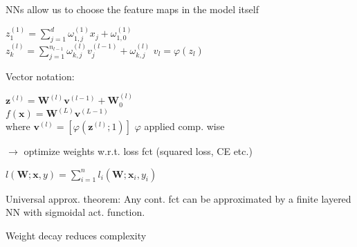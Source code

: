 NNs allow us to choose the feature maps in the model itself


\begin{center}
    $z_1^{(1)} = \sum_{j=1}^d\omega_{1,j}^{(1)}x_j + \omega_{1,0}^{(1)}$\\
    $z_k^{(l)} = \sum_{j=1}^{n_{l-1}}\omega_{k,j}^{(l)}v_{j}^{(l-1)} + \omega_{k,j}^{(l)}$ \hspace{0.2cm} $v_l = \varphi(z_l)$
\end{center}

Vector notation:
\begin{center}
    $\boldsymbol{z}^{(l)} = \boldsymbol{W}^{(l)}\boldsymbol{v}^{(l-1)} + \boldsymbol{W}_0^{(l)}$\\
    $f(\boldsymbol{x}) = \boldsymbol{W}^{(L)}\boldsymbol{v}^{(L-1)}$\\
    where $\boldsymbol{v}^{(l)} = \left[\varphi(\boldsymbol{z}^{(l)};1)\right]$ $\varphi$ applied comp. wise
\end{center}

$\rightarrow$ optimize weights w.r.t. loss fct (squared loss, CE etc.)

\begin{center}
    $l(\boldsymbol{W};\boldsymbol{x},y)= \sum_{i=1}^nl_i(\boldsymbol{W};\boldsymbol{x}_i,y_i)$
\end{center}
Universal approx. theorem: Any cont. fct can be approximated by a finite layered NN with sigmoidal act. function.

Weight decay reduces complexity





